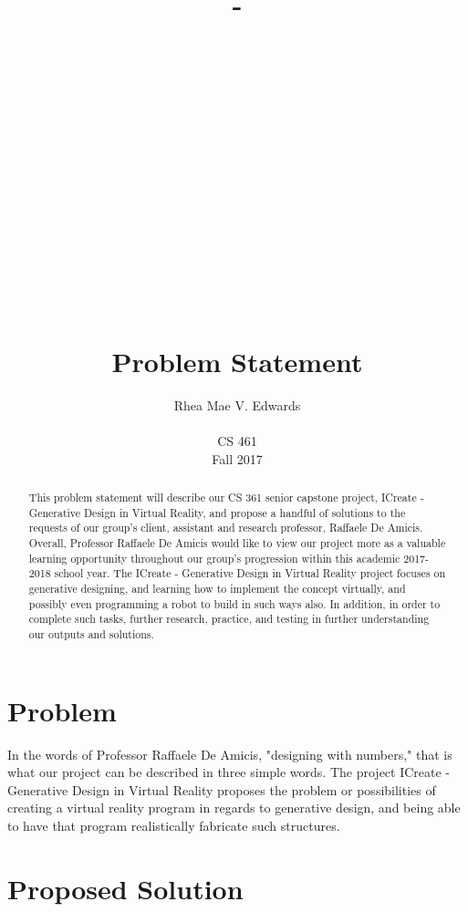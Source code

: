 \documentclass[letterpaper,10pt,onecolumn]{IEEEtran}
\title{-\\ ~ \\ ~ \\ ~ \\ ~ \\ ~ \\ ~ \\ ~ \\ ~ \\ ~ \\ Problem Statement}
\author{Rhea Mae V. Edwards\\ ~ \\CS 461\\Fall 2017}
\begin{document}
\maketitle

\begin{abstract}


\noindent
This problem statement will describe our CS 361 senior capstone project, ICreate - Generative Design in Virtual Reality, and propose a handful of solutions to the requests of our group's client, assistant and research professor, Raffaele De Amicis. Overall, Professor Raffaele De Amicis would like to view our project more as a valuable learning opportunity throughout our group's progression within this academic 2017-2018 school year. The ICreate - Generative Design in Virtual Reality project focuses on generative designing, and learning how to implement the concept virtually, and possibly even programming a robot to build in such ways also. In addition, in order to complete such tasks, further research, practice, and testing in further understanding our outputs and solutions.

\end{abstract}

\newpage

\section{\textbf{Problem}}

\iffalse
\noindent
Definition and description of the problem trying to solve
\par \noindent
Be sure to write this problem definition for a general but educated audience
\fi

In the words of Professor Raffaele De Amicis, "designing with numbers," that is what our project can be described in three simple words. The project ICreate - Generative Design in Virtual Reality proposes the problem or possibilities of creating a virtual reality program in regards to generative design, and being able to have that program realistically fabricate such structures. 

\section{\textbf{Proposed Solution}}
\end{document}
